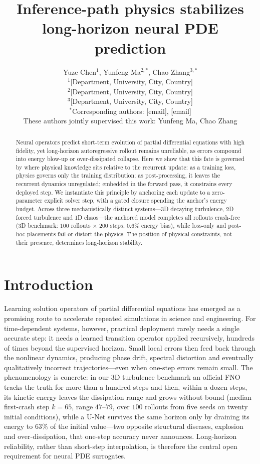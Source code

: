 \documentclass[11pt,a4paper]{article}
\title{\bfseries Inference-path physics stabilizes long-horizon neural PDE prediction}
\author{Yuze Chen$^{1}$, Yunfeng Ma$^{2,*}$, Chao Zhang$^{3,*}$\\[4pt]
\normalsize $^{1}$[Department, University, City, Country]\\
\normalsize $^{2}$[Department, University, City, Country]\\
\normalsize $^{3}$[Department, University, City, Country]\\
\normalsize $^{*}$Corresponding authors: [email], [email]\\[2pt]
\normalsize These authors jointly supervised this work: Yunfeng Ma, Chao Zhang}
\date{}
\begin{document}
\maketitle

\begin{abstract}
\noindent Neural operators predict short-term evolution of partial differential equations with high fidelity, yet long-horizon autoregressive rollout remains unreliable, as errors compound into energy blow-up or over-dissipated collapse. Here we show that this fate is governed by where physical knowledge sits relative to the recurrent update: as a training loss, physics governs only the training distribution; as post-processing, it leaves the recurrent dynamics unregulated; embedded in the forward pass, it constrains every deployed step. We instantiate this principle by anchoring each update to a zero-parameter explicit solver step, with a gated closure spending the anchor's energy budget. Across three mechanistically distinct systems---3D decaying turbulence, 2D forced turbulence and 1D chaos---the anchored model completes all rollouts crash-free (3D benchmark: $100$ rollouts $\times$ $200$ steps, $0.6\%$ energy bias), while loss-only and post-hoc placements fail or distort the physics. The position of physical constraints, not their presence, determines long-horizon stability.
\end{abstract}

\section*{Introduction}

Learning solution operators of partial differential equations has emerged as a promising route to accelerate repeated simulations in science and engineering\cite{lu2021deeponet,li2021fno,kovachki2023,yin2024dimon,azizzadenesheli2024}. For time-dependent systems, however, practical deployment rarely needs a single accurate step: it needs a learned transition operator applied recursively, hundreds of times beyond the supervised horizon. Small local errors then feed back through the nonlinear dynamics, producing phase drift, spectral distortion and eventually qualitatively incorrect trajectories---even when one-step errors remain small\cite{brandstetter2022mpnpde,mccabe2023stability,lippe2023pderefiner}. The phenomenology is concrete: in our 3D turbulence benchmark an official FNO tracks the truth for more than a hundred steps and then, within a dozen steps, its kinetic energy leaves the dissipation range and grows without bound (median first-crash step $k{=}65$, range $47$--$79$, over $100$ rollouts from five seeds on twenty initial conditions), while a U-Net survives the same horizon only by draining its energy to $63\%$ of the initial value---two opposite structural diseases, explosion and over-dissipation, that one-step accuracy never announces. Long-horizon reliability, rather than short-step interpolation, is therefore the central open requirement for neural PDE surrogates.
\end{document}
